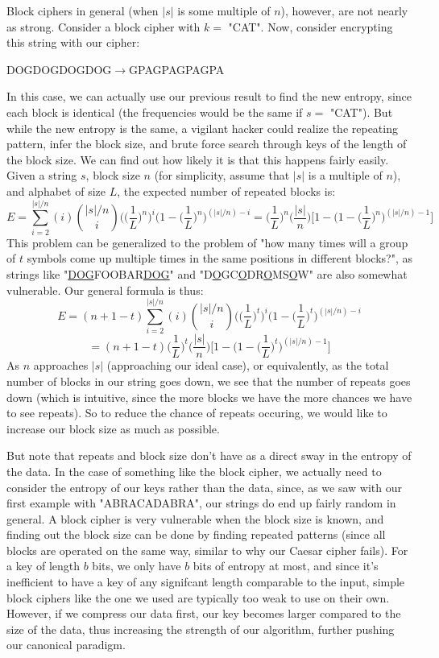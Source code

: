 \documentclass[11pt]{article}
\begin{document}
Block ciphers in general (when $|s|$ is some multiple of $n$), however, are not nearly as strong.
Consider a block cipher with $k=$ "CAT". Now, consider encrypting this string with our cipher:
\begin{center}DOGDOGDOGDOG$\rightarrow$GPAGPAGPAGPA\end{center}
In this case, we can actually use our previous result to find the new entropy, 
since each block is identical (the frequencies would be the same if $s=$ "CAT"). But while the new entropy is 
the same, a vigilant hacker could realize the repeating pattern, infer the block size, and brute force search through 
keys of the length of the block size. We can find out how likely it is that this happens fairly easily. 
Given a string $s$, block size $n$ (for simplicity, assume that $|s|$ is a multiple of $n$), and alphabet of size $L$, 
the expected number of repeated blocks is:
	$$E=\sum_{i=2}^{|s|/n}(i){{|s|/n}\choose i}\Big(\Big(\frac{1}{L}\Big)^n\Big)^i\Big(1-\Big(\frac{1}{L}\Big)^n\Big)^{(|s|/n)-i}
	=\Big(\frac{1}{L}\Big)^n\Big(\frac{|s|}{n}\Big)\Big[1-\Big(1-\Big(\frac{1}{L}\Big)^{n}\Big)^{(|s|/n)-1}\Big]$$
This problem can be generalized to the problem of "how many times will a group of  
$t$ symbols come up multiple times in the same positions in different blocks?", as strings like 
"\underline{DOG}FOOBAR\underline{DOG}" and "D\underline{O}GC\underline{O}DR\underline{O}MS\underline{O}W" 
are also somewhat vulnerable. Our general formula is thus:
	$$E=(n+1-t)
	\sum_{i=2}^{|s|/n}(i){{|s|/n}\choose i}
	\Big(\Big(\frac{1}{L}\Big)^{t}\Big)^i
	\Big(1-\Big(\frac{1}{L}\Big)^{t}\Big)^{(|s|/n)-i}$$
	$$=(n+1-t)
	\Big(\frac{1}{L}\Big)^{t}\Big(\frac{|s|}{n}\Big)
	\Big[1-\Big(1-\Big(\frac{1}{L}\Big)^{t}\Big)^{(|s|/n)-1}\Big]$$
As $n$ approaches $|s|$ (approaching our ideal case), or equivalently, as the total number of blocks in our string goes down, 
we see that the number of repeats goes down (which is intuitive, since the more blocks we have the more 
chances we have to see repeats). So to reduce the chance of repeats occuring, we would like to increase 
our block size as much as possible. 

But note that repeats and block size don't have as a direct sway in the entropy of the data. 
In the case of something like the block cipher, we actually need to consider the entropy of our keys rather than the data, 
since, as we saw with our first example with "ABRACADABRA", our strings do end up fairly random in general. 
A block cipher is very vulnerable when the block size is known, and finding out the block size can be 
done by finding repeated patterns (since all blocks are operated on the same way, similar to why our Caesar cipher fails). 
For a key of length $b$ bits, we only have $b$ bits of entropy at most, and since it's inefficient to have a key 
of any signifcant length comparable to the input, simple block ciphers like the one we used are typically too weak 
to use on their own. However, if we compress our data first, our key becomes larger compared to the size of the data, 
thus increasing the strength of our algorithm, further pushing our canonical paradigm. 
\end{document}
